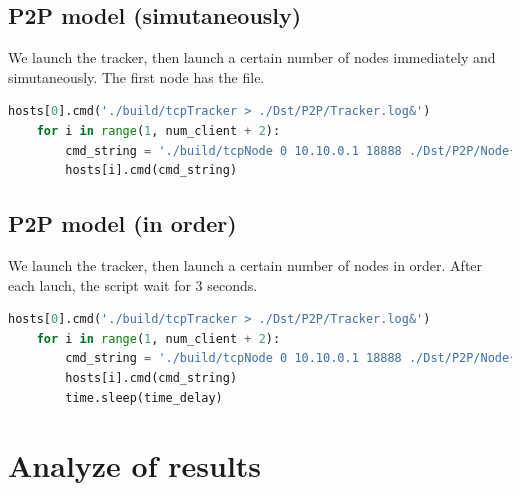 \subsection{P2P model (simutaneously)}
We launch the tracker, then launch a certain number of nodes immediately and simutaneously. The first node has the file.

\begin{lstlisting}[language=python]
    hosts[0].cmd('./build/tcpTracker > ./Dst/P2P/Tracker.log&')
    for i in range(1, num_client + 2):
        cmd_string = './build/tcpNode 0 10.10.0.1 18888 ./Dst/P2P/Node{}/ File_{}M  > ./Dst/P2P/Node{}.log&'.format(i, file_size, i)
        hosts[i].cmd(cmd_string)
\end{lstlisting}


\subsection{P2P model (in order)}
We launch the tracker, then launch a certain number of nodes in order. After each lauch, the script wait for 3 seconds.

\begin{lstlisting}[language=python]
    hosts[0].cmd('./build/tcpTracker > ./Dst/P2P/Tracker.log&')
    for i in range(1, num_client + 2):
        cmd_string = './build/tcpNode 0 10.10.0.1 18888 ./Dst/P2P/Node{}/ File_{}M  > ./Dst/P2P/Node{}.log&'.format(i, file_size, i)
        hosts[i].cmd(cmd_string)
        time.sleep(time_delay)
\end{lstlisting}


\section{Analyze of results}
